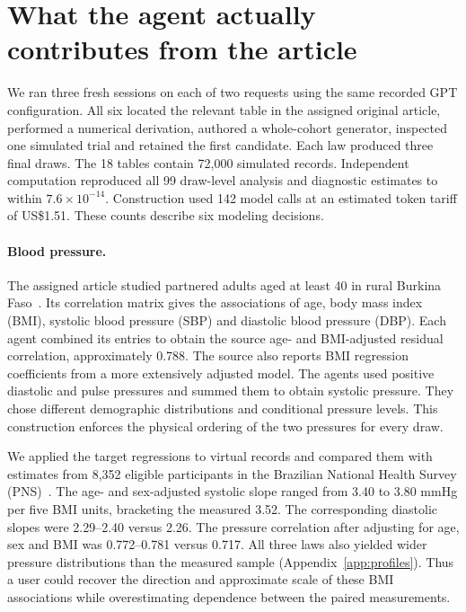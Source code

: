 \documentclass[sigconf,anonymous,review]{acmart}
\begin{document}
\section{What the agent actually contributes from the article}
\label{sec:original}

We ran three fresh sessions on each of two requests using the same recorded GPT configuration. All six located the relevant table in the assigned original article, performed a numerical derivation, authored a whole-cohort generator, inspected one simulated trial and retained the first candidate. Each law produced three final draws. The 18 tables contain 72,000 simulated records. Independent computation reproduced all 99 draw-level analysis and diagnostic estimates to within $7.6\times10^{-14}$. Construction used 142 model calls at an estimated token tariff of US\$1.51. These counts describe six modeling decisions.

\paragraph{Blood pressure.}
The assigned article studied partnered adults aged at least 40 in rural Burkina Faso~\cite{jaspert}. Its correlation matrix gives the associations of age, body mass index (BMI), systolic blood pressure (SBP) and diastolic blood pressure (DBP). Each agent combined its entries to obtain the source age- and BMI-adjusted residual correlation, approximately 0.788. The source also reports BMI regression coefficients from a more extensively adjusted model. The agents used positive diastolic and pulse pressures and summed them to obtain systolic pressure. They chose different demographic distributions and conditional pressure levels. This construction enforces the physical ordering of the two pressures for every draw.

We applied the target regressions to virtual records and compared them with estimates from 8,352 eligible participants in the Brazilian National Health Survey (PNS)~\cite{pns}. The age- and sex-adjusted systolic slope ranged from 3.40 to 3.80 mmHg per five BMI units, bracketing the measured 3.52. The corresponding diastolic slopes were 2.29--2.40 versus 2.26. The pressure correlation after adjusting for age, sex and BMI was 0.772--0.781 versus 0.717. All three laws also yielded wider pressure distributions than the measured sample (Appendix~\ref{app:profiles}). Thus a user could recover the direction and approximate scale of these BMI associations while overestimating dependence between the paired measurements.
\end{document}
